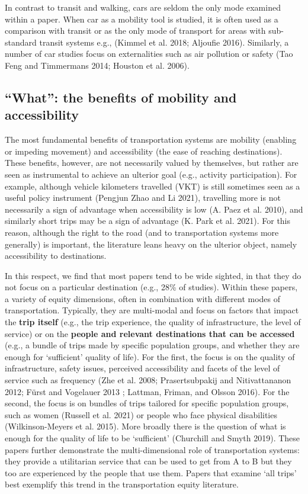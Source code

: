 \documentclass[12pt, oneside]{report}
\begin{document}
In contrast to transit and walking, cars are seldom the only mode
examined within a paper. When car as a mobility tool is studied, it is
often used as a comparison with transit or as the only mode of transport
for areas with sub-standard transit systems e.g., (Kimmel et al. 2018;
Aljoufie 2016). Similarly, a number of car studies focus on
externalities such as air pollution or safety (Tao Feng and Timmermans
2014; Houston et al. 2006).

\hypertarget{what-the-benefits-of-mobility-and-accessibility}{%
\subsection{``What'': the benefits of mobility and
accessibility}\label{what-the-benefits-of-mobility-and-accessibility}}

The most fundamental benefits of transportation systems are mobility
(enabling or impeding movement) and accessibility (the ease of reaching
destinations). These benefits, however, are not necessarily valued by
themselves, but rather are seen as instrumental to achieve an ulterior
goal (e.g., activity participation). For example, although vehicle
kilometers travelled (VKT) is still sometimes seen as a useful policy
instrument (Pengjun Zhao and Li 2021), travelling more is not
necessarily a sign of advantage when accessibility is low (A. Paez et
al. 2010), and similarly short trips may be a sign of advantage (K. Park
et al. 2021). For this reason, although the right to the road (and to
transportation systems more generally) is important, the literature
leans heavy on the ulterior object, namely accessibility to
destinations.

In this respect, we find that most papers tend to be wide sighted, in
that they do not focus on a particular destination (e.g., 28\% of
studies). Within these papers, a variety of equity dimensions, often in
combination with different modes of transportation. Typically, they are
multi-modal and focus on factors that impact the \textbf{trip itself}
(e.g., the trip experience, the quality of infrastructure, the level of
service) or on the \textbf{people and relevant destinations that can be
accessed} (e.g., a bundle of trips made by specific population groups,
and whether they are enough for `sufficient' quality of life). For the
first, the focus is on the quality of infrastructure, safety issues,
perceived accessibility and facets of the level of service such as
frequency (Zhe et al. 2008; Prasertsubpakij and Nitivattananon 2012;
Fürst and Vogelauer 2013 ; Lattman, Friman, and Olsson 2016). For the
second, the focus is on bundles of trips tailored for specific
population groups, such as women (Russell et al. 2021) or people who
face physical disabilities (Wilkinson-Meyers et al. 2015). More broadly
there is the question of what is enough for the quality of life to be
`sufficient' (Churchill and Smyth 2019). These papers further
demonstrate the multi-dimensional role of transportation systems: they
provide a utilitarian service that can be used to get from A to B but
they too are experienced by the people that use them. Papers that
examine `all trips' best exemplify this trend in the transportation
equity literature.
\end{document}
